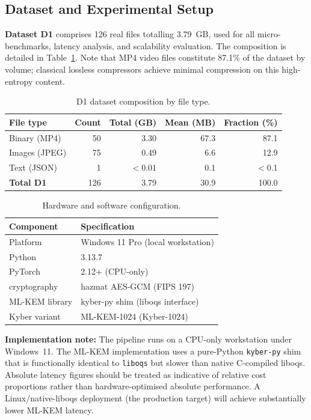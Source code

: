 \documentclass[twocolumn]{article}
\begin{document}
\subsection{Dataset and Experimental Setup}

\textbf{Dataset D1} comprises 126 real files totalling 3.79~GB, used for all
micro-benchmarks, latency analysis, and scalability evaluation. The composition
is detailed in Table~\ref{tab:d2}. Note that MP4 video files constitute 87.1\%
of the dataset by volume; classical lossless compressors achieve minimal
compression on this high-entropy content.

\begin{table}[t]
\caption{D1 dataset composition by file type.}
\label{tab:d2}
\centering\small
\begin{tabular}{lrrrr}
\toprule
File type & Count & Total (GB) & Mean (MB) & Fraction (\%) \\
\midrule
Binary (MP4) & 50 & 3.30 & 67.3 & 87.1 \\
Images (JPEG) & 75 & 0.49 & 6.6 & 12.9 \\
Text (JSON) & 1 & $<$0.01 & 0.1 & $<$0.1 \\
\midrule
\textbf{Total D1} & 126 & 3.79 & 30.9 & 100.0 \\
\bottomrule
\end{tabular}
\end{table}

\begin{table}[t]
\caption{Hardware and software configuration.}
\label{tab:config}
\centering\small
\begin{tabular}{ll}
\toprule
Component & Specification \\
\midrule
Platform & Windows 11 Pro (local workstation) \\
Python & 3.13.7 \\
PyTorch & 2.12+ (CPU-only) \\
cryptography & hazmat AES-GCM (FIPS 197) \\
ML-KEM library & kyber-py shim (liboqs interface) \\
Kyber variant & ML-KEM-1024 (Kyber-1024) \\
\bottomrule
\end{tabular}
\end{table}

\textbf{Implementation note:} The pipeline runs on a CPU-only workstation under
Windows~11. The ML-KEM implementation uses a pure-Python \texttt{kyber-py} shim
that is functionally identical to \texttt{liboqs} but slower than native
C-compiled liboqs. Absolute latency figures should be treated as indicative of
relative cost proportions rather than hardware-optimised absolute performance.
A Linux/native-liboqs deployment (the production target) will achieve
substantially lower ML-KEM latency.
\end{document}
